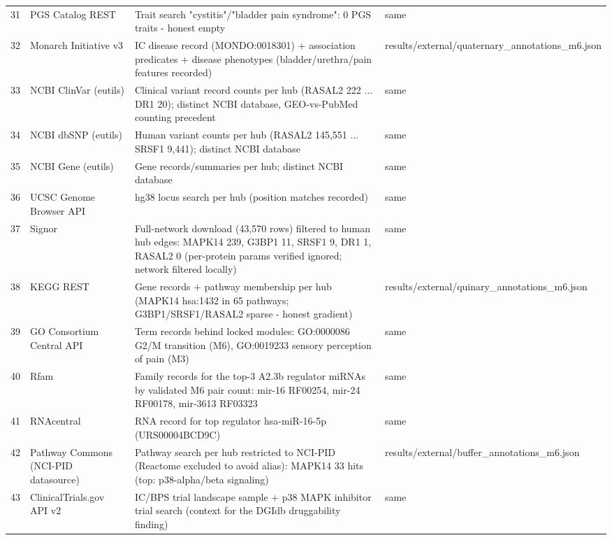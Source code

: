 \begin{longtable}{r p{} p{} p{}}
31 & PGS Catalog REST & Trait search "cystitis"/"bladder pain syndrome": 0 PGS traits - honest empty & same \\
32 & Monarch Initiative v3 & IC disease record (MONDO:0018301) + association predicates + disease phenotypes (bladder/urethra/pain features recorded) & results/external/quaternary\_annotations\_m6.json \\
33 & NCBI ClinVar (eutils) & Clinical variant record counts per hub (RASAL2 222 ... DR1 20); distinct NCBI database, GEO-vs-PubMed counting precedent & same \\
34 & NCBI dbSNP (eutils) & Human variant counts per hub (RASAL2 145,551 ... SRSF1 9,441); distinct NCBI database & same \\
35 & NCBI Gene (eutils) & Gene records/summaries per hub; distinct NCBI database & same \\
36 & UCSC Genome Browser API & hg38 locus search per hub (position matches recorded) & same \\
37 & Signor & Full-network download (43,570 rows) filtered to human hub edges: MAPK14 239, G3BP1 11, SRSF1 9, DR1 1, RASAL2 0 (per-protein params verified ignored; network filtered locally) & same \\
38 & KEGG REST & Gene records + pathway membership per hub (MAPK14 hsa:1432 in 65 pathways; G3BP1/SRSF1/RASAL2 sparse - honest gradient) & results/external/quinary\_annotations\_m6.json \\
39 & GO Consortium Central API & Term records behind locked modules: GO:0000086 G2/M transition (M6), GO:0019233 sensory perception of pain (M3) & same \\
40 & Rfam & Family records for the top-3 A2.3b regulator miRNAs by validated M6 pair count: mir-16 RF00254, mir-24 RF00178, mir-3613 RF03323 & same \\
41 & RNAcentral & RNA record for top regulator hsa-miR-16-5p (URS00004BCD9C) & same \\
42 & Pathway Commons (NCI-PID datasource) & Pathway search per hub restricted to NCI-PID (Reactome excluded to avoid alias): MAPK14 33 hits (top: p38-alpha/beta signaling) & results/external/buffer\_annotations\_m6.json \\
43 & ClinicalTrials.gov API v2 & IC/BPS trial landscape sample + p38 MAPK inhibitor trial search (context for the DGIdb druggability finding) & same \\
\hline\hline\end{longtable}
